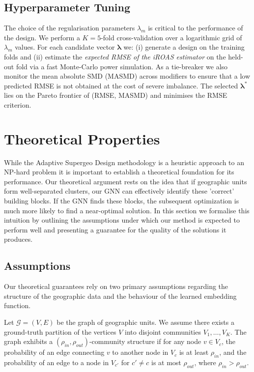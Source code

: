 \documentclass[final,3p,fleqn, 10pt]{elsarticle}
\begin{document}
    \subsection{Hyperparameter Tuning}
    The choice of the regularisation parameters $\lambda_m$ is critical to the performance of the design. We perform a $K{=}5$-fold cross-validation over a logarithmic grid of $\lambda_m$ values. For each candidate vector $\boldsymbol{\lambda}$ we: (i) generate a design on the training folds and (ii) estimate the \emph{expected RMSE of the iROAS estimator} on the held-out fold via a fast Monte-Carlo power simulation. As a tie-breaker we also monitor the mean absolute SMD (MASMD) across modifiers to ensure that a low predicted RMSE is not obtained at the cost of severe imbalance. The selected $\boldsymbol{\lambda}^*$ lies on the Pareto frontier of (RMSE, MASMD) and minimises the RMSE criterion.


\section{Theoretical Properties}
\label{sec:theory}
While the Adaptive Supergeo Design methodology is a heuristic approach to an NP-hard problem it is important to establish a theoretical foundation for its performance. Our theoretical argument rests on the idea that if geographic units form well-separated clusters, our GNN can effectively identify these 'correct' building blocks. If the GNN finds these blocks, the subsequent optimization is much more likely to find a near-optimal solution. In this section we formalise this intuition by outlining the assumptions under which our method is expected to perform well and presenting a guarantee for the quality of the solutions it produces.

    \subsection{Assumptions}
    Our theoretical guarantees rely on two primary assumptions regarding the structure of the geographic data and the behaviour of the learned embedding function.

    \begin{assumption}\label{assump:community}
    Let $\mathcal{G} = (V, E)$ be the graph of geographic units. We assume there exists a ground-truth partition of the vertices $V$ into disjoint communities $V_1, \dots, V_K$. The graph exhibits a $(\rho_{in}, \rho_{out})$-community structure if for any node $v \in V_c$, the probability of an edge connecting $v$ to another node in $V_c$ is at least $\rho_{in}$, and the probability of an edge to a node in $V_{c'}$ for $c' \neq c$ is at most $\rho_{out}$, where $\rho_{in} > \rho_{out}$.
    \end{assumption}
    
\end{document}
